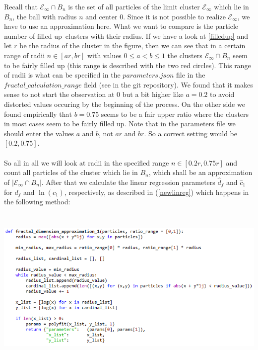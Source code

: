 \documentclass[12pt,a4paper]{scrartcl}
\newcommand{\E}{\mathcal{E}} %
\newcommand{\1}{\mathbbm{1}}
\theoremstyle{definition}
\numberwithin{equation}{section}
\begin{document}
Recall that $\E_\infty \cap B_n$ is the set of all particles of the limit cluster $\E_\infty$ which lie in $B_n$, the ball with radius $n$ and center $0$. Since it is not possible to realize $\E_\infty$, we have to use an approximation here. What we want to compare is the particle number of \glqq filled up\grqq\ clusters with their radius. If we have a look at \autoref{filledup} and let $r$ be the radius of the cluster in the figure, then we can see that in a certain range of radii $n\in[ar,br]$ with values $0\leq a< b \leq 1$ the clusters $\E_\infty \cap B_n$ seem to be fairly filled up (this range is described with the two red circles). This range of radii is what can be specified in the $\mathit{parameters.json}$ file in the $\mathit{fractal\_calculation\_range}$ field (see in the git repository). We found that it makes sense to not start the observation at $0$ but a bit higher like $a=0.2$ to avoid distorted values occuring by the beginning of the process. On the other side we found empirically that $b=0.75$ seems to be a fair upper ratio where the clusters in most cases seem to be fairly filled up. Note that in the parameters file we should enter the values $a$ and $b$, not $ar$ and $br$. So a correct setting would be $[0.2,0.75]$.  \\
\\So all in all we will look at radii in the specified range $n\in[0.2r, 0.75r]$ and count all particles of the cluster which lie in $B_n$, which shall be an approximation of $|\E_\infty \cap B_n|$. After that we calculate the linear regression parameters $\hat d_f$ and $\hat c_1$ for $d_f$ and $\ln(c_1)$, respectively, as described in (\ref{newlinreg}) which happens in the following method:\\
\\
\includegraphics[height=7.5cm]{images/code-snippets/fractalnew.png} \\
\end{document}
